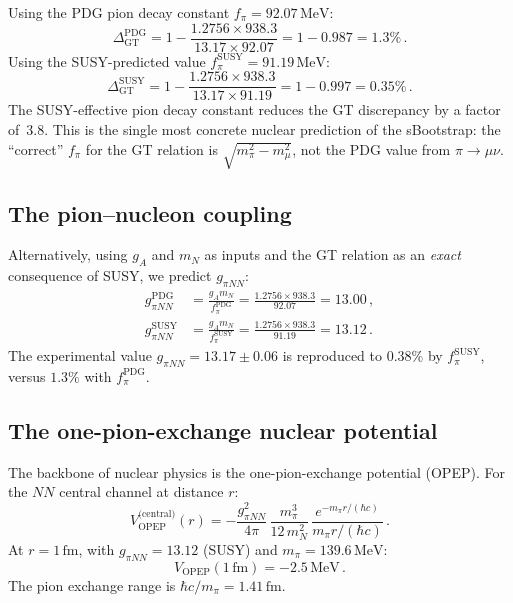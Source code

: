 \documentclass[12pt,a4paper]{article}
\newcommand{\MeV}{\,\text{MeV}}
\newcommand{\fpi}{f_\pi}
\begin{document}
Using the PDG pion decay constant $\fpi = 92.07\MeV$:
\begin{equation}
  \Delta_{\text{GT}}^{\text{PDG}}
  = 1 - \frac{1.2756 \times 938.3}{13.17 \times 92.07}
  = 1 - 0.987 = 1.3\%\,.
\end{equation}
Using the SUSY-predicted value $\fpi^{\text{SUSY}} = 91.19\MeV$:
\begin{equation}
  \boxed{
  \Delta_{\text{GT}}^{\text{SUSY}}
  = 1 - \frac{1.2756 \times 938.3}{13.17 \times 91.19}
  = 1 - 0.997 = 0.35\%\,.
  }
\end{equation}
The SUSY-effective pion decay constant reduces the GT discrepancy by a
factor of~$3.8$.  This is the single most concrete nuclear prediction
of the sBootstrap: the ``correct'' $\fpi$ for the GT relation is
$\sqrt{m_\pi^2 - m_\mu^2}$, not the PDG value from $\pi \to \mu\nu$.

\subsection{The pion--nucleon coupling}

Alternatively, using $g_A$ and $m_N$ as inputs and the GT relation as
an \emph{exact} consequence of SUSY, we predict $g_{\pi NN}$:
\begin{align}
  g_{\pi NN}^{\text{PDG}}
  &= \frac{g_A m_N}{\fpi^{\text{PDG}}}
   = \frac{1.2756 \times 938.3}{92.07} = 13.00\,,\\[4pt]
  g_{\pi NN}^{\text{SUSY}}
  &= \frac{g_A m_N}{\fpi^{\text{SUSY}}}
   = \frac{1.2756 \times 938.3}{91.19} = 13.12\,.
\end{align}
The experimental value $g_{\pi NN} = 13.17 \pm 0.06$ is reproduced
to $0.38\%$ by $\fpi^{\text{SUSY}}$, versus $1.3\%$ with
$\fpi^{\text{PDG}}$.

\subsection{The one-pion-exchange nuclear potential}

The backbone of nuclear physics is the one-pion-exchange potential
(OPEP).  For the $NN$ central channel at distance $r$:
\begin{equation}
  V_{\text{OPEP}}^{\text{(central)}}(r)
  = -\frac{g_{\pi NN}^2}{4\pi}\,
    \frac{m_\pi^3}{12\,m_N^2}\,
    \frac{e^{-m_\pi r / (\hbar c)}}{m_\pi r / (\hbar c)}\,.
\end{equation}
At $r = 1\,\text{fm}$, with $g_{\pi NN} = 13.12$ (SUSY) and
$m_\pi = 139.6\MeV$:
\begin{equation}
  V_{\text{OPEP}}(1\,\text{fm}) = -2.5\MeV\,.
\end{equation}
The pion exchange range is $\hbar c / m_\pi = 1.41\,\text{fm}$.
\end{document}
